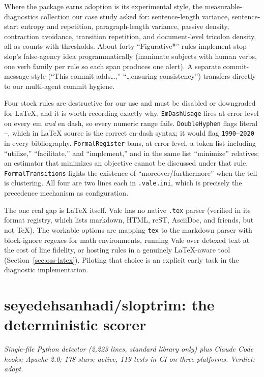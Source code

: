 Where the package earns adoption is its experimental style, the
measurable-diagnostics collection our case study asked for: sentence-length variance, sentence-start entropy and
repetition, paragraph-length variance, passive density, contraction
avoidance, transition repetition, and document-level tricolon density, all
as counts with thresholds. About forty ``Figurative*'' rules implement
stop-slop's false-agency idea programmatically (inanimate subjects with
human verbs, one verb family per rule so each span produces one alert). A
separate commit-message style (``This commit adds\ldots,''
``\ldots ensuring consistency'') transfers directly to our multi-agent
commit hygiene.

Four stock rules are destructive for our use and must be disabled or
downgraded for LaTeX, and it is worth recording exactly why.
\texttt{EmDashUsage} fires at error level on every em \emph{and} en dash,
so every numeric range fails. \texttt{DoubleHyphen} flags literal
\texttt{--}, which in LaTeX source is the correct en-dash syntax; it would
flag \texttt{1990--2020} in every bibliography. \texttt{FormalRegister}
bans, at error level, a token list including ``utilize,'' ``facilitate,''
and ``implement,'' and in the same list ``minimize'' relatives; an estimator
that minimizes an objective cannot be discussed under that rule.
\texttt{FormalTransitions} fights the existence of
``moreover/furthermore'' when the tell is clustering. All four are two
lines each in \texttt{.vale.ini}, which is precisely the precedence
mechanism as configuration.

The one real gap is LaTeX itself. Vale has no native \texttt{.tex} parser
(verified in its format registry, which lists markdown, HTML, reST,
AsciiDoc, and friends, but not TeX). The workable options are mapping
\texttt{tex} to the markdown parser with block-ignore regexes for math
environments, running Vale over detexed text at the cost of line fidelity,
or hosting rules in a genuinely LaTeX-aware tool
(Section~\ref{sec:oss-latex}). Piloting that choice is an explicit early
task in the diagnostic implementation.

\section{seyedehsanhadi/sloptrim: the deterministic scorer}
\label{sec:oss-sloptrim}

\emph{Single-file Python detector (2{,}223 lines, standard library only)
plus Claude Code hooks; Apache-2.0; 178 stars; active, 119 tests in CI on
three platforms. Verdict: adopt.}

